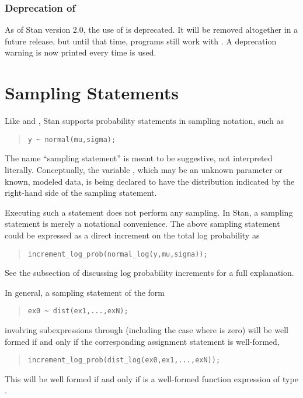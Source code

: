 \subsubsection{Deprecation of }

As of Stan version 2.0, the use of  is deprecated.  It
will be removed altogether in a future release, but until that time,
programs still work with .  A deprecation warning is now
printed every time  is used.


\section{Sampling Statements}\label{sampling-statements.section}

Like \BUGS and \JAGS, Stan supports probability statements in
sampling notation, such as
%
\begin{quote}
\begin{Verbatim}
y ~ normal(mu,sigma);
\end{Verbatim}
\end{quote}
%
The name ``sampling statement'' is meant to be suggestive, not
interpreted literally.  Conceptually, the variable , which may
be an unknown parameter or known, modeled data, is being declared
to have the distribution indicated by the right-hand side of the
sampling statement.

Executing such a statement does not perform any sampling.  In Stan, a
sampling statement is merely a notational convenience.  The above
sampling statement could be expressed as a direct increment on the
total log probability as
%
\begin{quote}
\begin{Verbatim}
increment_log_prob(normal_log(y,mu,sigma));
\end{Verbatim}
\end{quote}
%
See the subsection of  discussing log
probability increments for a full explanation.

In general, a sampling statement of the form
%
\begin{quote}
\begin{Verbatim}
ex0 ~ dist(ex1,...,exN);
\end{Verbatim}
\end{quote}
%
involving subexpressions  through  (including the
case where  is zero) will be well formed if and only if the
corresponding assignment statement is well-formed,
%
\begin{quote}
\begin{Verbatim}
increment_log_prob(dist_log(ex0,ex1,...,exN));
\end{Verbatim}
\end{quote}
%
This will be well formed if and only if
 is a well-formed function expression
of type .

